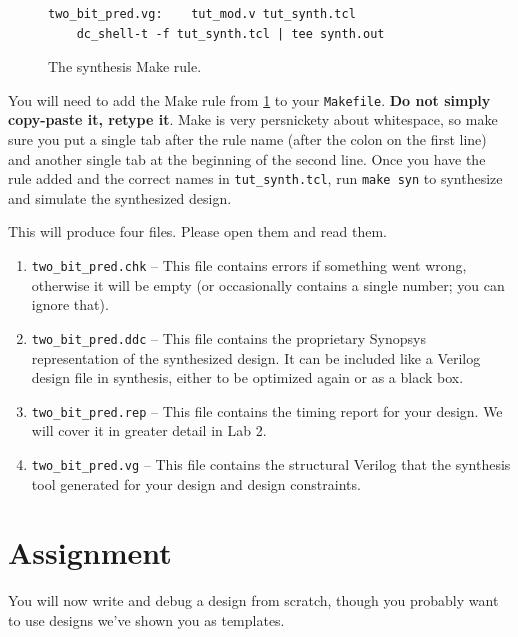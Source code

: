 \documentclass[dvipsnames]{article}
\begin{document}
\begin{figure}[H]
	\begin{verbatim}
two_bit_pred.vg:	tut_mod.v tut_synth.tcl
	dc_shell-t -f tut_synth.tcl | tee synth.out
	\end{verbatim}
	\caption{The synthesis Make rule.}
	\label{fig:make-syn}
\end{figure}

You will need to add the Make rule from \cref{fig:make-syn} to your
\texttt{Makefile}. \textbf{Do not simply copy-paste it, retype it}. Make is very
persnickety about whitespace, so make sure you put a single tab after the rule
name (after the colon on the first line) and another single tab at the beginning
of the second line. Once you have the rule added and the correct names in
\texttt{tut\_synth.tcl}, run \texttt{make syn} to synthesize and simulate the
synthesized design.

This will produce four files. Please open them and read them. 

\begin{enumerate}
	\item \texttt{two\_bit\_pred.chk} -- This file contains errors if something
		went wrong, otherwise it will be empty (or occasionally contains a single number; you can ignore that).
	\item \texttt{two\_bit\_pred.ddc} -- This file contains the proprietary
		Synopsys representation of the synthesized design. It can be included
		like a Verilog design file in synthesis, either to be optimized again or
		as a black box.
	\item \texttt{two\_bit\_pred.rep} -- This file contains the timing report
		for your design. We will cover it in greater detail in Lab 2.
	\item \texttt{two\_bit\_pred.vg} -- This file contains the structural
		Verilog that the synthesis tool generated for your design and design
		constraints.
\end{enumerate}

\section{Assignment}
You will now write and debug a design from scratch, though you probably want to
use designs we've shown you as templates.
\end{document}
